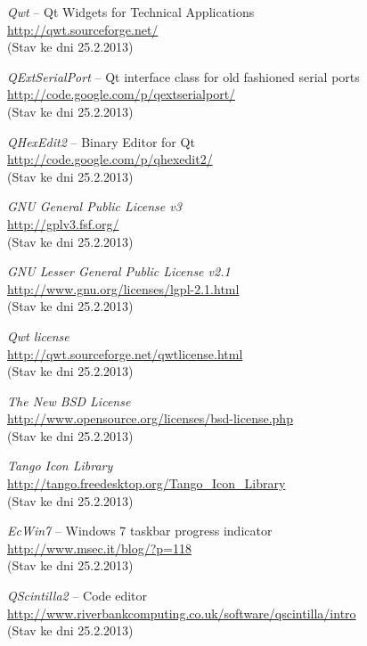 \documentclass[12pt, a4paper, oneside]{article}
\newcommand{\It}{\textit}  %
\begin{document}
\begin{thebibliography}{99}
     \It{Qwt} -- Qt Widgets for Technical Applications \\
    \url{http://qwt.sourceforge.net/}\\
    (Stav ke dni 25.2.2013)

     \It{QExtSerialPort} -- Qt interface class for old fashioned serial ports \\
    \url{http://code.google.com/p/qextserialport/}\\
    (Stav ke dni 25.2.2013)

     \It{QHexEdit2} -- Binary Editor for Qt \\
    \url{http://code.google.com/p/qhexedit2/}\\
    (Stav ke dni 25.2.2013)

     \It{GNU General Public License v3} \\
    \url{http://gplv3.fsf.org/}\\
    (Stav ke dni 25.2.2013)

     \It{GNU Lesser General Public License v2.1} \\
    \url{http://www.gnu.org/licenses/lgpl-2.1.html}\\
    (Stav ke dni 25.2.2013)

     \It{Qwt license} \\
    \url{http://qwt.sourceforge.net/qwtlicense.html}\\
    (Stav ke dni 25.2.2013)

     \It{The New BSD License} \\
    \url{http://www.opensource.org/licenses/bsd-license.php}\\
    (Stav ke dni 25.2.2013)

     \It{Tango Icon Library} \\
    \url{http://tango.freedesktop.org/Tango_Icon_Library}\\
    (Stav ke dni 25.2.2013)

     \It{EcWin7} -- Windows 7 taskbar progress indicator \\
    \url{http://www.msec.it/blog/?p=118}\\
    (Stav ke dni 25.2.2013)

     \It{QScintilla2} -- Code editor \\
    \url{http://www.riverbankcomputing.co.uk/software/qscintilla/intro}\\
    (Stav ke dni 25.2.2013)


\end{thebibliography}
\end{document}
